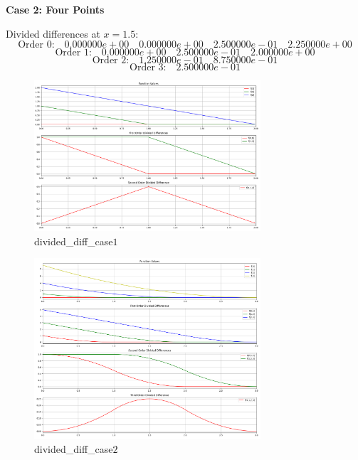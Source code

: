 \documentclass[a4paper]{article}
\begin{document}
\textbf{Case 2: Four Points}

Divided differences at \( x = 1.5 \):
\[
\text{Order 0:} \quad 0.000000e+00 \quad 0.000000e+00 \quad 2.500000e-01 \quad 2.250000e+00
\]
\[
\text{Order 1:} \quad 0.000000e+00 \quad 2.500000e-01 \quad 2.000000e+00
\]
\[
\text{Order 2:} \quad 1.250000e-01 \quad 8.750000e-01
\]
\[
\text{Order 3:} \quad 2.500000e-01
\]

\begin{figure}[H]
    \centering
    \includegraphics[width=0.75\textwidth]{figure/divided_diff_case1.png}
    \caption{divided\_diff\_case\(1\)}
    \label{fig:divided_diff_case1}
\end{figure}
\begin{figure}[H]
    \centering
    \includegraphics[width=0.75\textwidth]{figure/divided_diff_case2.png}
    \caption{divided\_diff\_case\(2\)}
    \label{fig:divided_diff_case2}
\end{figure}
\end{document}
